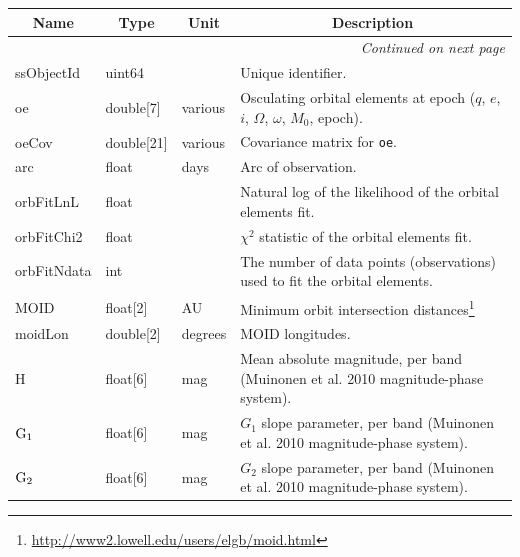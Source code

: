 \begin{center}
\label{tab:SSObj}
\begin{longtable}{p{3cm}p{2cm}p{2cm}p{5cm}}

\hline \multicolumn{1}{c}{\bf Name} & \multicolumn{1}{c}{\bf Type} & \multicolumn{1}{c}{\bf Unit} & \multicolumn{1}{c}{\bf Description} \\ \hline
\endhead

\hline \multicolumn{4}{r}{{\em Continued on next page}} \\
\endfoot

\hline\hline
\endlastfoot

ssObjectId & uint64 & ~ & Unique identifier. \\

oe & double[7] & various & Osculating orbital elements at epoch ($q$, $e$, $i$, $\Omega$, $\omega$, $M_0$, epoch). \\

oeCov & double[21] & various & Covariance matrix for \texttt{oe}. \\

arc & float & days & Arc of observation. \\

orbFitLnL & float & ~ & Natural log of the likelihood of the orbital elements fit. \\

orbFitChi2 & float & ~ & $\chi^2$ statistic of the orbital elements fit. \\

orbFitNdata & int & ~ & The number of data points (observations) used to fit the orbital elements. \\

MOID & float[2] & AU & Minimum orbit intersection distances\footnote{\url{http://www2.lowell.edu/users/elgb/moid.html}} \\

moidLon & double[2] & degrees & MOID longitudes. \\

H & float[6] & mag & Mean absolute magnitude, per band (Muinonen et al. 2010 magnitude-phase system). \\

${\rm G_1}$ & float[6] & mag & $G_1$ slope parameter, per band (Muinonen et al. 2010 magnitude-phase system). \\

${\rm G_2}$ & float[6] & mag & $G_2$ slope parameter, per band (Muinonen et al. 2010 magnitude-phase system). \\


\end{longtable}
\end{center}

